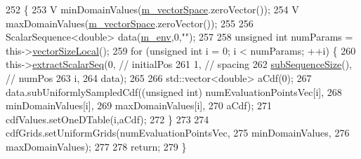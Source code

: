 \begin{DoxyCode}
252 \{
253   V minDomainValues(\hyperlink{class_q_u_e_s_o_1_1_base_vector_sequence_a4bd171e39ed050ff105c808336f35198}{m\_vectorSpace}.zeroVector());
254   V maxDomainValues(\hyperlink{class_q_u_e_s_o_1_1_base_vector_sequence_a4bd171e39ed050ff105c808336f35198}{m\_vectorSpace}.zeroVector());
255 
256   ScalarSequence<double> data(\hyperlink{class_q_u_e_s_o_1_1_base_vector_sequence_a8e8824d2a63c5a43bcc6473e3a0491e8}{m\_env},0,\textcolor{stringliteral}{""});
257 
258   \textcolor{keywordtype}{unsigned} \textcolor{keywordtype}{int} numParams = this->\hyperlink{class_q_u_e_s_o_1_1_base_vector_sequence_a2fefedf9e5b90f22881103b3f92555f6}{vectorSizeLocal}();
259   \textcolor{keywordflow}{for} (\textcolor{keywordtype}{unsigned} \textcolor{keywordtype}{int} i = 0; i < numParams; ++i) \{
260     this->\hyperlink{class_q_u_e_s_o_1_1_sequence_of_vectors_ac977b3b26a6af2ae727671f1246262fd}{extractScalarSeq}(0,                 \textcolor{comment}{// initialPos}
261                            1,                 \textcolor{comment}{// spacing}
262                            \hyperlink{class_q_u_e_s_o_1_1_sequence_of_vectors_a0224bd3e961d86af5d2886301c0c2b86}{subSequenceSize}(), \textcolor{comment}{// numPos}
263                            i,
264                            data);
265 
266     std::vector<double> aCdf(0);
267     data.subUniformlySampledCdf((\textcolor{keywordtype}{unsigned} \textcolor{keywordtype}{int}) numEvaluationPointsVec[i],
268                                 minDomainValues[i],
269                                 maxDomainValues[i],
270                                 aCdf);
271     cdfValues.setOneDTable(i,aCdf);
272   \}
273 
274   cdfGrids.setUniformGrids(numEvaluationPointsVec,
275                            minDomainValues,
276                            maxDomainValues);
277 
278   \textcolor{keywordflow}{return};
279 \}
\end{DoxyCode}
